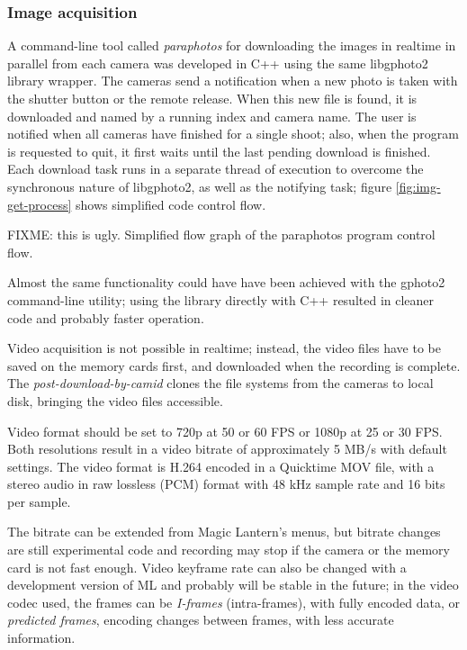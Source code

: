 
\subsubsection{Image acquisition} %


A command-line tool called \emph{paraphotos} for downloading the images in realtime in parallel from each camera was developed in C++ using the same libgphoto2 library wrapper.
The cameras send a notification when a new photo is taken with the shutter button or the remote release.
When this new file is found, it is downloaded and named by a running index and camera name.
The user is notified when all cameras have finished for a single shoot; also, when the program is requested to quit, it first waits until the last pending download is finished.
Each download task runs in a separate thread of execution to overcome the synchronous nature of libgphoto2, as well as the notifying task; figure \ref{fig:img-get-process} shows simplified code control flow.

{FIXME: this is ugly. Simplified flow graph of the paraphotos program control flow.}

Almost the same functionality could have have been achieved with the gphoto2 command-line utility; using the library directly with C++ resulted in cleaner code and probably faster operation.

Video acquisition is not possible in realtime; instead, the video files have to be saved on the memory cards first, and downloaded when the recording is complete.
The \emph{post-download-by-camid} clones the file systems from the cameras to local disk, bringing the video files accessible.

Video format should be set to 720p at 50 or 60 FPS or 1080p at 25 or 30 FPS.
Both resolutions result in a video bitrate of approximately 5 MB/s with default settings.
The video format is H.264 encoded in a Quicktime MOV file, with a stereo audio in raw lossless (PCM) format with 48 kHz sample rate and 16 bits per sample.

The bitrate can be extended from Magic Lantern's menus, but bitrate changes are still experimental code and recording may stop if the camera or the memory card is not fast enough.
Video keyframe rate can also be changed with a development version of ML and probably will be stable in the future;
in the video codec used, the frames can be \emph{I-frames} (intra-frames), with fully encoded data, or \emph{predicted frames}, encoding changes between frames, with less accurate information.

